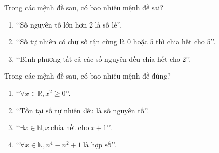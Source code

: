  \begin{ex}%
 	Trong các mệnh đề sau, có bao nhiêu mệnh đề sai?
 	\begin{enumerate}
 		\item \lq\lq Số nguyên tố lớn hơn $2$ là số lẻ\rq\rq.
 		\item \lq\lq Số tự nhiên có chữ số tận cùng là $0$ hoặc $5$ thì chia hết cho $5$\rq\rq.
 		\item \lq\lq Bình phương tất cả các số nguyên đều chia hết cho $2$\rq\rq.
 	\end{enumerate}
 \end{ex}
 \begin{ex}%
 	Trong các mệnh đề sau, có bao nhiêu mệnh đề đúng?
 	\begin{enumerate}
 		\item \lq\lq$\forall x\in \mathbb{R}, x^2\geq 0$\rq\rq.
 		\item  \lq\lq$\text{Tồn tại số tự nhiên đều là số nguyên tố}$\rq\rq.
 		\item \lq\lq$\exists x\in \mathbb{N}, x\  \text{chia hết cho}\ x+1$\rq\rq.
 		\item \lq\lq$\forall x\in \mathbb{N}, n^4-n^2+1\ \text{là hợp số}$\rq\rq.
 	\end{enumerate}
 \end{ex}
 
